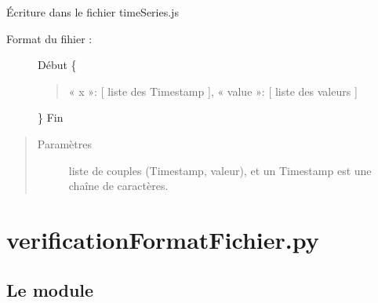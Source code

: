 \documentclass[letterpaper,10pt,french]{sphinxmanual}
\begin{document}
\begin{fulllineitems}
\label{\detokenize{addQuantitativesDiscretes:add.addQuantitativesDiscretes.infoSerieTemporelle}}
Écriture dans le fichier timeSeries.js
\begin{description}
\item[{Format du fihier :}] \leavevmode
Début
\{
\begin{quote}

« x »: {[} liste des Timestamp {]},
« value »: {[} liste des valeurs {]}
\end{quote}

\}
Fin

\end{description}
\begin{quote}\begin{description}
\item[{Paramètres}] \leavevmode
{} \textendash{} liste de couples (Timestamp, valeur), et un Timestamp est une chaîne de caractères.

\end{description}\end{quote}

\end{fulllineitems}



\chapter{verificationFormatFichier.py}
\label{\detokenize{verificationFormatFichier:module-chargement_des_donnees.verificationFormatFichier}}\label{\detokenize{verificationFormatFichier::doc}}\label{\detokenize{verificationFormatFichier:verificationformatfichier-py}}

\section{Le module }
\label{\detokenize{verificationFormatFichier:le-module-verification-format-fichier}}
\end{document}
